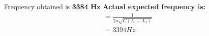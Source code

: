 \begin{enumerate}[label=\arabic*.,ref=\theenumi]
Frequency obtained is \textbf{3384 Hz}\newline
\textbf{Actual expected frequency is:}
\begin{align}
    = \frac{1}{2\pi \sqrt{C(L_1 +L_2)}}\\
    = 3394 Hz
\end{align}
\end{enumerate}